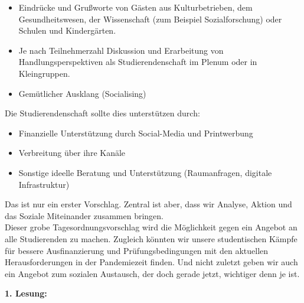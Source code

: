 {\begin{itemize}
            für die Bewältigung der Pandemie usw.
        \item Eindrücke und Grußworte von Gästen aus Kulturbetrieben, dem Gesundheitswesen, der
            Wissenschaft (zum Beispiel Sozialforschung) oder Schulen und Kindergärten.
        \item Je nach Teilnehmerzahl Diskussion und Erarbeitung von Handlungsperspektiven als
            Studierendenschaft im Plenum oder in Kleingruppen.
        \item Gemütlicher Ausklang (Socialising)
    \end{itemize}
    Die Studierendenschaft sollte dies unterstützen durch:
    \begin{itemize}
        \item Finanzielle Unterstützung durch Social-Media und Printwerbung
        \item Verbreitung über ihre Kanäle
        \item Sonstige ideelle Beratung und Unterstützung (Raumanfragen, digitale Infrastruktur)
    \end{itemize}
    Das ist nur ein erster Vorschlag. Zentral ist aber, dass wir Analyse, Aktion und das Soziale
    Miteinander zusammen bringen.\\
    Dieser grobe Tagesordnungsvorschlag wird die Möglichkeit gegen ein Angebot an alle Studierenden
    zu machen. Zugleich könnten wir unsere studentischen Kämpfe für bessere Ausfinanzierung und
    Prüfungsbedingungen mit den aktuellen Herausforderungen in der Pandemiezeit finden. Und nicht
    zuletzt geben wir auch ein Angebot zum sozialen Austausch, der doch gerade jetzt, wichtiger denn je ist.
}{\textbf{1. Lesung:}
    \ul{
            \ul{}
            \ul{
                }
            \ul{}
}}
